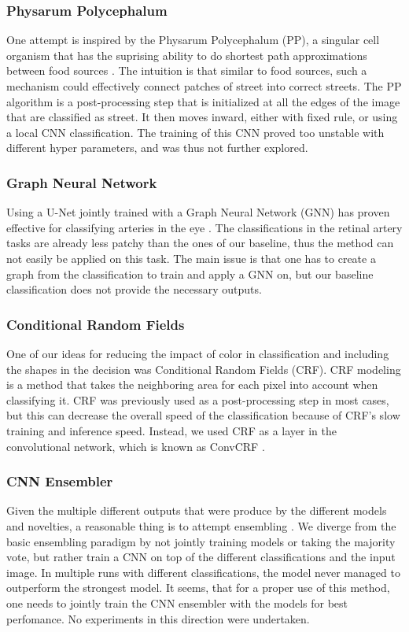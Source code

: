     \subsubsection{Physarum Polycephalum}
    One attempt is inspired by the Physarum Polycephalum (PP), a singular cell organism that has the suprising ability to do shortest path approximations between food sources \cite{nakagaki2001smart}. The intuition is that similar to food sources, such a mechanism could effectively connect patches of street into correct streets. The PP algorithm is a post-processing step that is initialized at all the edges of the image that are classified as street. It then moves inward, either with fixed rule, or using a local CNN classification. The training of this CNN proved too unstable with different hyper parameters, and was thus not further explored.
   
    \subsubsection{Graph Neural Network}
    Using a U-Net jointly trained with a Graph Neural Network (GNN) has proven effective for classifying arteries in the eye \cite{shin2019deep}. The classifications in the retinal artery tasks are already less patchy than the ones of our baseline, thus the method can not easily be applied on this task. The main issue is that one has to create a graph from the classification to train and apply a GNN on, but our baseline classification does not provide the necessary outputs.
    
    \subsubsection{Conditional Random Fields}
    One of our ideas for reducing the impact of color in classification and including the shapes in the decision was Conditional Random Fields (CRF). CRF modeling is a method that takes the neighboring area for each pixel into account when classifying it. CRF was previously used as a post-processing step in most cases, but this can decrease the overall speed of the classification because of CRF's slow training and inference speed. Instead, we used CRF as a layer in the convolutional network, which is known as ConvCRF \cite{convcrf}.
    
    \subsubsection{CNN Ensembler}
    Given the multiple different outputs that were produce by the different models and novelties, a reasonable thing is to attempt ensembling \cite{hansen1990neural}. We diverge from the basic ensembling paradigm by not jointly training models or taking the majority vote, but rather train a CNN on top of the different classifications and the input image. In multiple runs with different classifications, the model never managed to outperform the strongest model. It seems, that for a proper use of this method, one needs to jointly train the CNN ensembler with the models for best perfomance. No experiments in this direction were undertaken.

